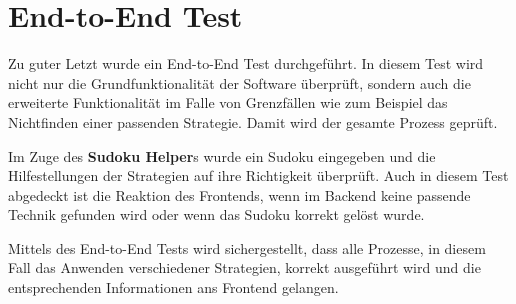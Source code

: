 \section{End-to-End Test}
Zu guter Letzt wurde ein End-to-End Test durchgeführt. In diesem Test wird nicht nur die Grundfunktionalität der Software überprüft, sondern auch die erweiterte Funktionalität im Falle von Grenzfällen wie zum Beispiel das Nichtfinden einer passenden Strategie. Damit wird der gesamte Prozess geprüft. 

Im Zuge des \textbf{Sudoku Helper}s wurde ein Sudoku eingegeben und die Hilfestellungen der Strategien auf ihre Richtigkeit überprüft. Auch in diesem Test abgedeckt ist die Reaktion des Frontends, wenn im Backend keine passende Technik gefunden wird oder wenn das Sudoku korrekt gelöst wurde.

Mittels des End-to-End Tests wird sichergestellt, dass alle Prozesse, in diesem Fall das Anwenden verschiedener Strategien, korrekt ausgeführt wird und die entsprechenden Informationen ans Frontend gelangen.
